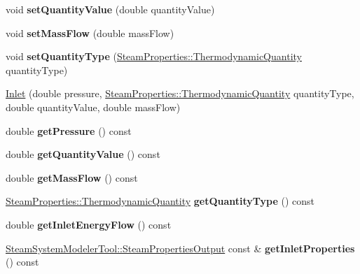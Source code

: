 \begin{DoxyCompactItemize}
\mbox{\label{class_inlet_a64a5567c35c89f82f5782bf7b83b90c3}} 
void {\bfseries set\+Quantity\+Value} (double quantity\+Value)
\item 
\mbox{\label{class_inlet_a1e427ac34eeebf46546ed53499359459}} 
void {\bfseries set\+Mass\+Flow} (double mass\+Flow)
\item 
\mbox{\label{class_inlet_a4171632101de3f4c97c93bb06c6b51e4}} 
void {\bfseries set\+Quantity\+Type} (\hyperlink{class_steam_properties_ae0294bedf7d178c2d8fb6aed0f62fbff}{Steam\+Properties\+::\+Thermodynamic\+Quantity} quantity\+Type)
\item 
\hyperlink{class_inlet_a1b0e1d27b8c7b11cfd96623b1c0b8a9e}{Inlet} (double pressure, \hyperlink{class_steam_properties_ae0294bedf7d178c2d8fb6aed0f62fbff}{Steam\+Properties\+::\+Thermodynamic\+Quantity} quantity\+Type, double quantity\+Value, double mass\+Flow)
\item 
\mbox{\label{class_inlet_af9bc455eb1287892901b7d090dabddfd}} 
double {\bfseries get\+Pressure} () const
\item 
\mbox{\label{class_inlet_ac9279e9c81b989b795351f09c4dd2b71}} 
double {\bfseries get\+Quantity\+Value} () const
\item 
\mbox{\label{class_inlet_af32941228d08175cb13d6f7757de39aa}} 
double {\bfseries get\+Mass\+Flow} () const
\item 
\mbox{\label{class_inlet_a3ed1699b174d0698af937c7146bbee79}} 
\hyperlink{class_steam_properties_ae0294bedf7d178c2d8fb6aed0f62fbff}{Steam\+Properties\+::\+Thermodynamic\+Quantity} {\bfseries get\+Quantity\+Type} () const
\item 
\mbox{\label{class_inlet_a870b939e6b0de093a42341e3fa22d75b}} 
double {\bfseries get\+Inlet\+Energy\+Flow} () const
\item 
\mbox{\label{class_inlet_a6f2f7f2569a5815c60c728d6930b59af}} 
\hyperlink{struct_steam_system_modeler_tool_1_1_steam_properties_output}{Steam\+System\+Modeler\+Tool\+::\+Steam\+Properties\+Output} const  \& {\bfseries get\+Inlet\+Properties} () const
\item 

\end{DoxyCompactItemize}
